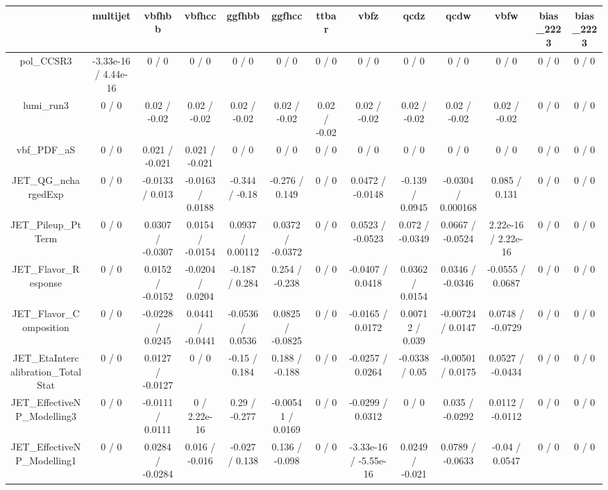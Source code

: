 \documentclass[10pt]{article}
\begin{document}
\begin{table}[htbp]
\begin{center}
\begin{tabular}{|c|c|c|c|c|c|c|c|c|c|c|c|c|}
\hline 
      & multijet      & vbfhbb      & vbfhcc      & ggfhbb      & ggfhcc      & ttbar      & vbfz      & qcdz      & qcdw      & vbfw      & bias_2223      & bias_2223 \\ 
\hline 
  pol_CCSR3 & -3.33e-16 / 4.44e-16 & 0 / 0 & 0 / 0 & 0 / 0 & 0 / 0 & 0 / 0 & 0 / 0 & 0 / 0 & 0 / 0 & 0 / 0 & 0 / 0 & 0 / 0 \\ 
  lumi_run3 & 0 / 0 & 0.02 / -0.02 & 0.02 / -0.02 & 0.02 / -0.02 & 0.02 / -0.02 & 0.02 / -0.02 & 0.02 / -0.02 & 0.02 / -0.02 & 0.02 / -0.02 & 0.02 / -0.02 & 0 / 0 & 0 / 0 \\ 
  vbf_PDF_aS & 0 / 0 & 0.021 / -0.021 & 0.021 / -0.021 & 0 / 0 & 0 / 0 & 0 / 0 & 0 / 0 & 0 / 0 & 0 / 0 & 0 / 0 & 0 / 0 & 0 / 0 \\ 
  JET_QG_nchargedExp & 0 / 0 & -0.0133 / 0.013 & -0.0163 / 0.0188 & -0.344 / -0.18 & -0.276 / 0.149 & 0 / 0 & 0.0472 / -0.0148 & -0.139 / 0.0945 & -0.0304 / 0.000168 & 0.085 / 0.131 & 0 / 0 & 0 / 0 \\ 
  JET_Pileup_PtTerm & 0 / 0 & 0.0307 / -0.0307 & 0.0154 / -0.0154 & 0.0937 / 0.00112 & 0.0372 / -0.0372 & 0 / 0 & 0.0523 / -0.0523 & 0.072 / -0.0349 & 0.0667 / -0.0524 & 2.22e-16 / 2.22e-16 & 0 / 0 & 0 / 0 \\ 
  JET_Flavor_Response & 0 / 0 & 0.0152 / -0.0152 & -0.0204 / 0.0204 & -0.187 / 0.284 & 0.254 / -0.238 & 0 / 0 & -0.0407 / 0.0418 & 0.0362 / 0.0154 & 0.0346 / -0.0346 & -0.0555 / 0.0687 & 0 / 0 & 0 / 0 \\ 
  JET_Flavor_Composition & 0 / 0 & -0.0228 / 0.0245 & 0.0441 / -0.0441 & -0.0536 / 0.0536 & 0.0825 / -0.0825 & 0 / 0 & -0.0165 / 0.0172 & 0.00712 / 0.039 & -0.00724 / 0.0147 & 0.0748 / -0.0729 & 0 / 0 & 0 / 0 \\ 
  JET_EtaIntercalibration_TotalStat & 0 / 0 & 0.0127 / -0.0127 & 0 / 0 & -0.15 / 0.184 & 0.188 / -0.188 & 0 / 0 & -0.0257 / 0.0264 & -0.0338 / 0.05 & -0.00501 / 0.0175 & 0.0527 / -0.0434 & 0 / 0 & 0 / 0 \\ 
  JET_EffectiveNP_Modelling3 & 0 / 0 & -0.0111 / 0.0111 & 0 / 2.22e-16 & 0.29 / -0.277 & -0.00541 / 0.0169 & 0 / 0 & -0.0299 / 0.0312 & 0 / 0 & 0.035 / -0.0292 & 0.0112 / -0.0112 & 0 / 0 & 0 / 0 \\ 
  JET_EffectiveNP_Modelling1 & 0 / 0 & 0.0284 / -0.0284 & 0.016 / -0.016 & -0.027 / 0.138 & 0.136 / -0.098 & 0 / 0 & -3.33e-16 / -5.55e-16 & 0.0249 / -0.021 & 0.0789 / -0.0633 & -0.04 / 0.0547 & 0 / 0 & 0 / 0 \\ 

\end{tabular}
\end{center}
\end{table}
\end{document}
